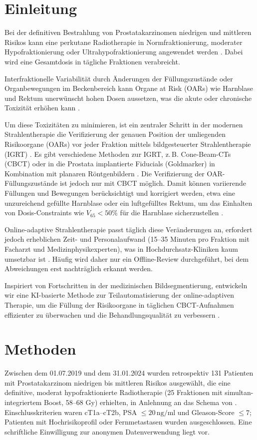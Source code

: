 \documentclass{article}
\begin{document}
\section{Einleitung}
Bei der definitiven Bestrahlung von Prostatakarzinomen niedrigen und mittleren
Risikos kann eine perkutane Radiotherapie in Normfraktionierung, moderater
Hypofraktionierung oder Ultrahypofraktionierung angewendet werden
\citep{numakura2023,junius2007,dimuzio2009}. Dabei wird eine
Gesamtdosis in tägliche Fraktionen verabreicht.

Interfraktionelle Variabilität durch Änderungen der Füllungszustände oder
Organbewegungen im Beckenbereich kann Organe at Risk (OARs) wie Harnblase und
Rektum unerwünscht hohen Dosen aussetzen, was die akute oder chronische Toxizität
erhöhen kann \citep{quantec,devlin2015}.

Um diese Toxizitäten zu minimieren, ist ein zentraler Schritt in der modernen
Strahlentherapie die Verifizierung der genauen Position der umliegenden
Risikoorgane (OARs) vor jeder Fraktion mittels bildgesteuerter Strahlentherapie
(IGRT) \citep{kupelian2007,wang2022}. Es gibt verschiedene Methoden zur IGRT, z.\,B.
Cone-Beam-CTs (CBCT) oder in die Prostata implantierte Fiducials (Goldmarker) in
Kombination mit planaren Röntgenbildern \citep{dang2018}. Die Verifizierung der
OAR-Füllungszustände ist jedoch nur mit CBCT möglich. Damit können variierende
Füllungen und Bewegungen berücksichtigt und korrigiert werden, etwa eine
unzureichend gefüllte Harnblase oder ein luftgefülltes Rektum, um das Einhalten
von Dosis-Constraints wie \( V_{65} < 50\% \) für die Harnblase sicherzustellen
\citep{wall2018}.

Online-adaptive Strahlentherapie passt täglich diese Veränderungen an, erfordert
jedoch erheblichen Zeit- und Personalaufwand (15–35 Minuten pro Fraktion mit
Facharzt und Medizinphysikexperten), was in Hochdurchsatz-Kliniken kaum umsetzbar
ist \citep{byrne2022}. Häufig wird daher nur ein Offline-Review durchgeführt, bei
dem Abweichungen erst nachträglich erkannt werden.

Inspiriert von Fortschritten in der medizinischen Bildsegmentierung, entwickeln
wir eine KI-basierte Methode zur Teilautomatisierung der online-adaptiven Therapie,
um die Füllung der Risikoorgane in täglichen CBCT-Aufnahmen effizienter zu
überwachen und die Behandlungsqualität zu verbessern \citep{antonelli2022}.

\section{Methoden}
Zwischen dem 01.07.2019 und dem 31.01.2024 wurden retrospektiv 131 Patienten mit
Prostatakarzinom niedrigen bis mittleren Risikos ausgewählt, die eine
definitive, moderat hypofraktionierte Radiotherapie (25 Fraktionen mit
simultan-integriertem Boost, 58–68 Gy) erhielten, in Anlehnung an das Schema von
\citep{dimuzio2009}. Einschlusskriterien waren cT1a–cT2b, PSA $\leq
20\,\text{ng/ml}$ und Gleason-Score $\leq 7$; Patienten mit Hochrisikoprofil
oder Fernmetastasen wurden ausgeschlossen. Eine schriftliche Einwilligung zur
anonymen Datenverwendung liegt vor.
\end{document}
